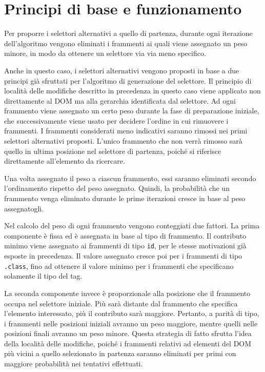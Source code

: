 \documentclass[12pt]{toptesi}
\begin{document}
\section{Principi di base e funzionamento}

Per proporre i selettori alternativi a quello di partenza, durante ogni iterazione dell'algoritmo vengono eliminati i frammenti ai quali viene assegnato un peso minore, in modo da ottenere un selettore via via meno specifico. 

Anche in questo caso, i selettori alternativi vengono proposti in base a due principi già sfruttati per l'algoritmo di generazione del selettore. Il principio di località delle modifiche descritto in precedenza in questo caso viene applicato non direttamente al DOM ma alla gerarchia identificata dal selettore. Ad ogni frammento viene assegnato un certo peso durante la fase di preparazione iniziale, che successivamente viene usato per decidere l'ordine in cui rimuovere i frammenti. I frammenti considerati meno indicativi saranno rimossi nei primi selettori alternativi proposti. L'unico frammento che non verrà rimosso sarà quello in ultima posizione nel selettore di partenza, poiché si riferisce direttamente all'elemento da ricercare. 

Una volta assegnato il peso a ciascun frammento, essi saranno eliminati secondo l'ordinamento rispetto del peso assegnato. Quindi, la probabilità che un frammento venga eliminato durante le prime iterazioni cresce in base al peso assegnatogli.

Nel calcolo del peso di ogni frammento vengono conteggiati due fattori. La prima componente è fissa ed è assegnata in base al tipo di frammento. Il contributo minimo viene assegnato ai frammenti di tipo \verb|id|, per le stesse motivazioni già esposte in precedenza. Il valore assegnato cresce poi per i frammenti di tipo \verb|.class|, fino ad ottenere il valore minimo per i frammenti che specificano solamente il tipo del tag.

La seconda componente invece è proporzionale alla posizione che il frammento occupa nel selettore iniziale. Più sarà distante dal frammento che specifica l'elemento interessato, più il contributo sarà maggiore. Pertanto, a parità di tipo, i frammenti nelle posizioni iniziali avranno un peso maggiore, mentre quelli nelle posizioni finali avranno un peso minore. Questa strategia di fatto sfrutta l'idea della località delle modifiche, poiché i frammenti relativi ad elementi del DOM più vicini a quello selezionato in partenza saranno eliminati per primi con maggiore probabilità nei tentativi effettuati.
\end{document}

